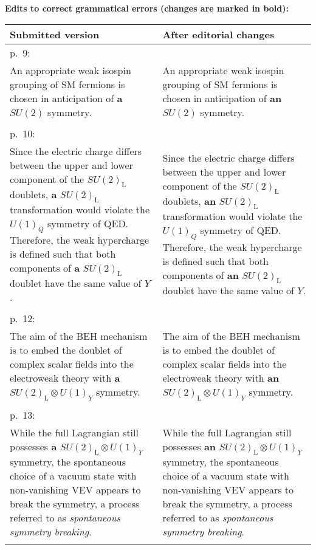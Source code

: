\documentclass[fontsize=11pt, paper=a4]{scrartcl}
\begin{document}

\textbf{Edits to correct grammatical errors (changes are marked in bold):}\\
\begin{center}
  \begin{tabular}{p{}@{\hskip 0.05\textwidth}p{}}
  \toprule
  Submitted version & After editorial changes\\
  \midrule

  p.\ 9: &\\
  An appropriate weak isospin grouping of SM fermions is chosen in anticipation of \textbf{a} $SU(2)$ symmetry. &
  An appropriate weak isospin grouping of SM fermions is chosen in anticipation of \textbf{an} $SU(2)$ symmetry.\\\\


  p.\ 10: &\\
  Since the electric charge differs between the upper and lower component of the $SU(2)_{\text{L}}$ doublets, \textbf{a} $SU(2)_{\text{L}}$ transformation would violate the $U(1)_Q$ symmetry of QED. Therefore, the weak hypercharge is defined such that both components of \textbf{a} $SU(2)_{\text{L}}$ doublet have the same value of $Y$. &
  Since the electric charge differs between the upper and lower component of the $SU(2)_{\text{L}}$ doublets, \textbf{an} $SU(2)_{\text{L}}$ transformation would violate the $U(1)_Q$ symmetry of QED. Therefore, the weak hypercharge is defined such that both components of \textbf{an} $SU(2)_{\text{L}}$ doublet have the same value of $Y$.\\\\

  p.\ 12: &\\
  The aim of the BEH mechanism is to embed the doublet of complex scalar fields into the electroweak theory with \textbf{a} $SU(2)_{\text{L}}\otimes U(1)_Y$ symmetry.&
  The aim of the BEH mechanism is to embed the doublet of complex scalar fields into the electroweak theory with \textbf{an} $SU(2)_{\text{L}}\otimes U(1)_Y$ symmetry.\\\\

  p.\ 13: &\\
  While the full Lagrangian still possesses \textbf{a} $SU(2)_{\text{L}} \otimes U(1)_Y$ symmetry, the spontaneous choice of a vacuum state with non-vanishing VEV appears to break the symmetry, a process referred to as \emph{spontaneous symmetry breaking}. &
  While the full Lagrangian still possesses \textbf{an} $SU(2)_{\text{L}} \otimes U(1)_Y$ symmetry, the spontaneous choice of a vacuum state with non-vanishing VEV appears to break the symmetry, a process referred to as \emph{spontaneous symmetry breaking}.\\\\


\end{tabular}
\end{center}
\end{document}
